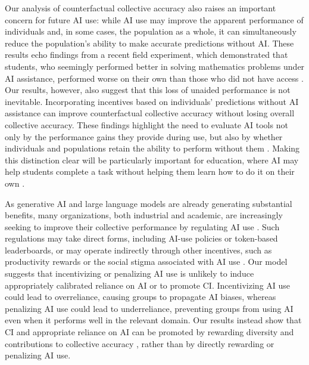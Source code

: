 \documentclass[12pt]{article}
\begin{document}
Our analysis of counterfactual collective accuracy also raises an important concern for future AI use:
while AI use may improve the apparent performance of individuals and, in some cases, the population as a whole, it can simultaneously reduce the population's ability to make accurate predictions without AI. 
These results echo findings from a recent field experiment, which demonstrated that students, who seemingly performed better in solving mathematics problems under AI assistance, performed worse on their own than those who did not have access \citep{bastani2025generative}.
Our results, however, also suggest that this loss of unaided performance is not inevitable.
Incorporating incentives based on individuals' predictions without AI assistance can improve counterfactual collective accuracy without losing overall collective accuracy.
These findings highlight the need to evaluate AI tools not only by the performance gains they provide during use, but also by whether individuals and populations retain the ability to perform without them \citep{melumad2025experimental,ke2026ai}.
Making this distinction clear will be particularly important for education, where AI may help students complete a task without helping them learn how to do it on their own \citep{bastani2025generative,melumad2025experimental}.

As generative AI and large language models are already generating substantial benefits, many organizations, both industrial and academic, are increasingly seeking to improve their collective performance by regulating AI use \citep{thorp2023chatgpt,bousquette2026tokenmaxxing,chawla2026researchers,keary2026cult}.
Such regulations may take direct forms, including AI-use policies or token-based leaderboards, or may operate indirectly through other incentives, such as productivity rewards or the social stigma associated with AI use \citep{reif2025evidence}.
Our model suggests that incentivizing or penalizing AI use is unlikely to induce appropriately calibrated reliance on AI or to promote CI.
Incentivizing AI use could lead to overreliance, causing groups to propagate AI biases, whereas penalizing AI use could lead to underreliance, preventing groups from using AI even when it performs well in the relevant domain.
Our results instead show that CI and appropriate reliance on AI can be promoted by rewarding diversity and contributions to collective accuracy \citep{hong2004groups,lorenz2011social,mann2017optimal}, rather than by directly rewarding or penalizing AI use.
\end{document}
